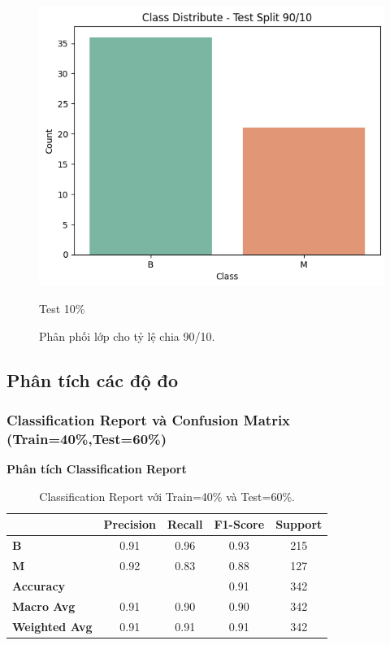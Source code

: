 \begin{figure}[h!]
\begin{minipage}[b]{0.32\linewidth}
		\centering
		\includegraphics[width=\linewidth]{figures/dataset1/4.3.png}
		\caption{Test 10\%}
		\label{fig:test10}
	\end{minipage}
	\caption{Phân phối lớp cho tỷ lệ chia 90/10.}
	\label{fig:split_90_10}
\end{figure}
\newpage
\subsection{Phân tích các độ đo}

\subsubsection{Classification Report và Confusion Matrix (Train=40\%,Test=60\%)}

\textbf{Phân tích Classification Report}

\begin{table}[h!]
	\centering
	\begin{tabular}{|l|c|c|c|c|}
		\hline
		\textbf{} & \textbf{Precision} & \textbf{Recall} & \textbf{F1-Score} & \textbf{Support} \\ \hline
		\textbf{B} & 0.91 & 0.96 & 0.93 & 215 \\ \hline
		\textbf{M} & 0.92 & 0.83 & 0.88 & 127 \\ \hline
		\textbf{Accuracy} & \multicolumn{2}{c|}{} & 0.91 & 342 \\ \hline
		\textbf{Macro Avg} & 0.91 & 0.90 & 0.90 & 342 \\ \hline
		\textbf{Weighted Avg} & 0.91 & 0.91 & 0.91 & 342 \\ \hline
	\end{tabular}
	\caption{Classification Report với Train=40\% và Test=60\%.}

\end{table}



